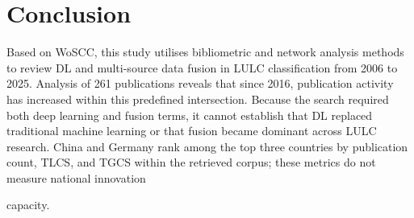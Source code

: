 \documentclass[]{interact}
\theoremstyle{plain}%
\theoremstyle{definition}
\theoremstyle{remark}
\DeclareRobustCommand{\DIFadd}[1]{{\protect\color{DIFaddcolor}\uwave{#1}}}
\DeclareRobustCommand{\DIFdel}[1]{{\protect\color{DIFdelcolor}\sout{#1}}}
\def\DIFadd#1{#1}%
\def\DIFdel#1{}%
\begin{document}
\section{Conclusion}
Based on \DIFdel{the} \DIFdel{Web} \DIFdel{of} \DIFdel{Science} \DIFdel{Core} \DIFdel{Collection} \DIFadd{WoSCC}, this study \DIFdel{utilizes} \DIFadd{utilises} bibliometric and network analysis methods to \DIFdel{systematically} review \DIFdel{the} \DIFdel{application} \DIFdel{of} \DIFdel{deep} \DIFdel{learning} \DIFdel{(} DL\DIFdel{)} and multi-source data fusion in LULC \DIFdel{simulation} \DIFadd{classification} from 2006 to 2025. Analysis of 261 \DIFdel{core} publications reveals that since 2016, \DIFdel{research} \DIFadd{publication} activity has \DIFdel{grown} \DIFdel{exponentially} \DIFadd{increased} \DIFadd{within} \DIFadd{this} \DIFadd{predefined} \DIFadd{intersection}\DIFadd{.} \DIFadd{Because} \DIFadd{the} \DIFadd{search} \DIFadd{required} \DIFadd{both} \DIFadd{deep} \DIFadd{learning} \DIFadd{and} \DIFadd{fusion} \DIFadd{terms}, \DIFdel{marking} \DIFdel{a} \DIFdel{decisive} \DIFdel{shift} \DIFdel{in} \DIFdel{the} \DIFdel{methodological} \DIFdel{landscape}\DIFdel{.} \DIFdel{Deep} \DIFdel{learning} \DIFdel{has} \DIFdel{thoroughly} \DIFadd{it} \DIFadd{cannot} \DIFadd{establish} \DIFadd{that} \DIFadd{DL} replaced traditional machine learning\DIFdel{,}\DIFdel{such} \DIFdel{as} \DIFdel{SVM} \DIFdel{and} \DIFdel{Random} \DIFdel{Forest} \DIFdel{as} \DIFdel{the} \DIFadd{or} \DIFadd{that} \DIFadd{fusion} \DIFadd{became} dominant \DIFdel{paradigm}\DIFdel{,} \DIFdel{demonstrating} \DIFdel{superior} \DIFdel{performance} \DIFdel{in} \DIFdel{handling} \DIFdel{the} \DIFdel{complexities} \DIFdel{of} \DIFdel{remote} \DIFdel{sensing} \DIFdel{big} \DIFdel{data} \DIFadd{across} \DIFadd{LULC} \DIFadd{research}. \DIFdel{From} \DIFdel{a} \DIFdel{global} \DIFdel{perspective}\DIFdel{,} China and Germany \DIFdel{have} \DIFdel{emerged} \DIFdel{as} \DIFadd{rank} \DIFadd{among} the \DIFdel{primary} \DIFdel{hubs} \DIFdel{of} \DIFadd{top} \DIFadd{three} \DIFadd{countries} \DIFadd{by} \DIFadd{publication} \DIFadd{count}\DIFadd{,} \DIFadd{TLCS}\DIFadd{,} \DIFadd{and} \DIFadd{TGCS} \DIFadd{within} \DIFadd{the} \DIFadd{retrieved} \DIFadd{corpus}\DIFadd{;} \DIFadd{these} \DIFadd{metrics} \DIFadd{do} \DIFadd{not} \DIFadd{measure} \DIFadd{national} innovation\DIFdel{,} \DIFdel{leading} \DIFdel{in} \DIFdel{both} \DIFdel{publication} \DIFdel{volume} \DIFdel{and} \DIFdel{long-term} \DIFdel{citation} \DIFdel{impact}\DIFdel{.}

\DIFdel{The} \DIFdel{technical} \DIFdel{evolution} \DIFdel{analyzed} \DIFdel{in} \DIFdel{this} \DIFdel{review} \DIFdel{underscores} \DIFdel{a} \DIFdel{fundamental} \DIFdel{transition} \DIFdel{from} \DIFdel{single-source} \DIFdel{data} \DIFdel{processing} \DIFdel{to} \DIFdel{heterogeneous} \DIFdel{multi-source} \DIFdel{fusion} \DIFadd{capacity}.
\end{document}
